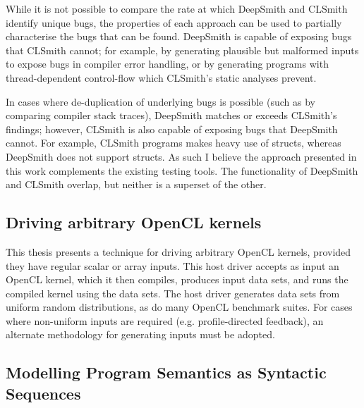 While it is not possible to compare the rate at which DeepSmith and CLSmith identify unique bugs, the properties of each approach can be used to partially characterise the bugs that can be found. DeepSmith is capable of exposing bugs that CLSmith cannot; for example, by generating plausible but malformed inputs to expose bugs in compiler error handling, or by generating programs with thread-dependent control-flow which CLSmith's static analyses prevent.

In cases where de-duplication of underlying bugs is possible (such as by comparing compiler stack traces), DeepSmith matches or exceeds CLSmith's findings; however, CLSmith is also capable of exposing bugs that DeepSmith cannot. For example, CLSmith programs makes heavy use of structs, whereas DeepSmith does not support structs. As such I believe the approach presented in this work complements the existing testing tools. The functionality of DeepSmith and CLSmith overlap, but neither is a superset of the other.


\subsection{Driving arbitrary OpenCL kernels}

This thesis presents a technique for driving arbitrary OpenCL kernels, provided they have regular scalar or array inputs. This host driver accepts as input an OpenCL kernel, which it then compiles, produces input data sets, and runs the compiled kernel using the data sets. The host driver generates data sets from uniform random distributions, as do many OpenCL benchmark suites. For cases where non-uniform inputs are required (e.g. profile-directed feedback), an alternate methodology for generating inputs must be adopted.






\subsection{Modelling Program Semantics as Syntactic Sequences}

